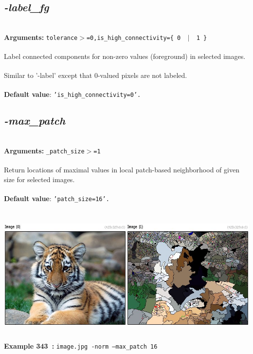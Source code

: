 \documentclass[a4paper,11pt,twoside]{book}
\begin{document}
\subsection{\emph{-label\_fg} }\vspace*{-0.5em}
~\\\textbf{Arguments: } 
{\small \texttt{tolerance$>$=0,is\_high\_connectivity=\{ 0 ~$|$~ 1 \}}}\\~\\
Label connected components for non-zero values (foreground) in selected images.
~\\Similar to '-label' except that 0-valued pixels are not labeled.
~\\~\\\textbf{Default value}: {\small \texttt{'is\_high\_connectivity=0'.}}


\subsection{\emph{-max\_patch} }\vspace*{-0.5em}
~\\\textbf{Arguments: } 
{\small \texttt{\_patch\_size$>$=1}}\\~\\
Return locations of maximal values in local patch-based neighborhood of given size for selected images.
~\\~\\\textbf{Default value}: {\small \texttt{'patch\_size=16'.}}
\begin{center}\includegraphics[keepaspectratio=true,height=7cm,width=\textwidth]{img/gmic_def343.jpg}\\
{\footnotesize \textbf{Example 343~:} \texttt{image.jpg -norm --max\_patch 16}}
\end{center}
\end{document}

